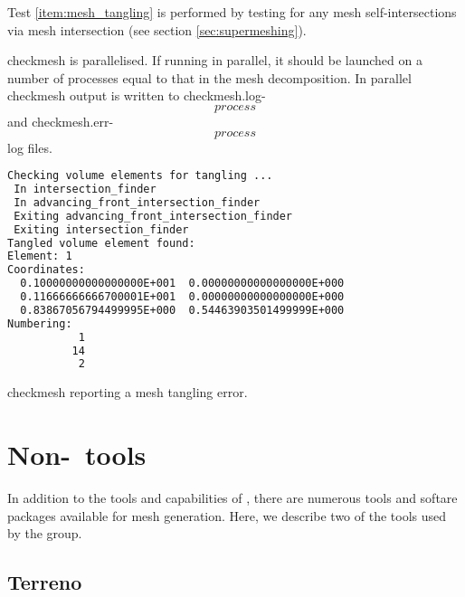 Test \ref{item:mesh_tangling} is performed by testing for any mesh self-intersections
via mesh intersection (see section \ref{sec:supermeshing}).

checkmesh is parallelised. If running in parallel, it should be launched on a number
of processes equal to that in the mesh decomposition. In parallel checkmesh output
is written to checkmesh.log-\[process\] and checkmesh.err-\[process\] log files.

\begin{example}
\begin{lstlisting}[language = Bash]
Checking volume elements for tangling ...
 In intersection_finder
 In advancing_front_intersection_finder
 Exiting advancing_front_intersection_finder
 Exiting intersection_finder
Tangled volume element found: 
Element: 1
Coordinates:
  0.10000000000000000E+001  0.00000000000000000E+000
  0.11666666666700001E+001  0.00000000000000000E+000
  0.83867056794499995E+000  0.54463903501499999E+000
Numbering:
           1
          14
           2
\end{lstlisting}
\caption{checkmesh reporting a mesh tangling error.}
\end{example}

\section{Non-\fluidity\ tools}

In addition to the tools and capabilities of \fluidity, there are numerous
tools and softare packages available for mesh generation. Here, we describe 
two of the tools used by the group.

\subsection{Terreno}

